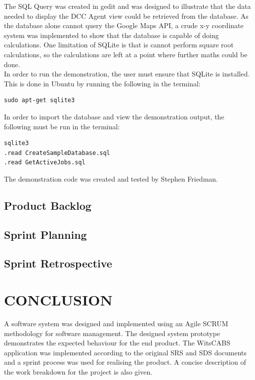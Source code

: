 \documentclass[12pt]{article}
\begin{document}
The SQL Query was created in gedit and was designed to illustrate that the data needed to display the DCC Agent view could be retrieved from the database. As the database alone cannot query the Google Maps API, a crude x-y coordinate system was implemented to show that the database is capable of doing calculations. One limitation of SQLite is that is cannot perform square root calculations, so the calculations are left at a point where further maths could be done. \\

In order to run the demonstration, the user must ensure that SQLite is installed. This is done in Ubuntu by running the following in the terminal:
\begin{verbatim}
sudo apt-get sqlite3
\end{verbatim}
In order to import the database and view the demonstration output, the following must be run in the terminal:
\begin{verbatim}
sqlite3
.read CreateSampleDatabase.sql
.read GetActiveJobs.sql
\end{verbatim}

The demonstration code was created and tested by Stephen Friedman.

\subsection{Product Backlog}

\subsection{Sprint Planning}
\subsection{Sprint Retrospective}
\newpage
\section{CONCLUSION}
A software system was designed and implemented using an Agile SCRUM methodology for software management. The designed system prototype demonstrates the expected behaviour for the end product. The WitsCABS application was implemented according to the original SRS and SDS documents and a sprint process was used for realising the product. A concise description of the work breakdown for the project is also given.
\end{document}
